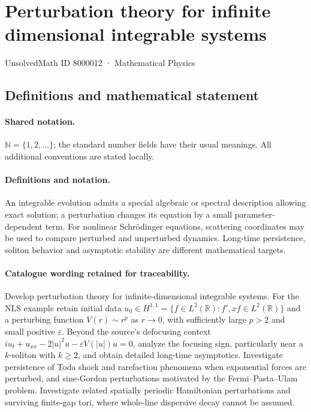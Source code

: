 \documentclass[11pt]{article}
\begin{document}
\setcounter{section}{8000011}
\section{Perturbation theory for infinite dimensional integrable systems}\label{8000012}
{\small UnsolvedMath ID 8000012 · Mathematical Physics}
\subsection{Definitions and mathematical statement}

\paragraph{Shared notation.}$\mathbb N=\{1,2,\ldots\}$; the standard number fields have their usual meanings. All additional conventions are stated locally.


\paragraph{Definitions and notation.}An integrable evolution admits a special algebraic or spectral description allowing exact solution; a perturbation changes its equation by a small parameter-dependent term. For nonlinear Schrödinger equations, scattering coordinates may be used to compare perturbed and unperturbed dynamics. Long-time persistence, soliton behavior and asymptotic stability are different mathematical targets.

\paragraph{Catalogue wording retained for traceability.}
Develop perturbation theory for infinite-dimensional integrable systems. For the NLS example retain initial data $u_0\in H^{1,1}=\{f\in L^2(\mathbb R):f',xf\in L^2(\mathbb R)\}$ and a perturbing function $V(r)\sim r^p$ as $r\to0$, with sufficiently large $p>2$ and small positive $\varepsilon$. Beyond the source's defocusing context $iu_t+u_{xx}-2|u|^2u-\varepsilon V(|u|)u=0$, analyze the focusing sign, particularly near a $k$-soliton with $k\ge2$, and obtain detailed long-time asymptotics. Investigate persistence of Toda shock and rarefaction phenomena when exponential forces are perturbed, and sine-Gordon perturbations motivated by the Fermi--Pasta--Ulam problem. Investigate related spatially periodic Hamiltonian perturbations and surviving finite-gap tori, where whole-line dispersive decay cannot be assumed.
\end{document}
